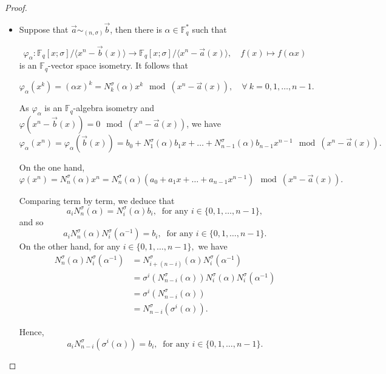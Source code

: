 \documentclass[12pt,paper]{article}
\theoremstyle{plain}
\newcommand{\Fq}{\mathbb{F}_{q}}
\begin{document}
\begin{proof}\;
\begin{itemize}
    \item[(1) $\Rightarrow$ (2):] 
    Suppose that $ \vec{a} \sim_{(n,\sigma)} \vec{b} $, then there is $\alpha \in \mathbb{F}_q^*$ such that

$$\varphi_{\alpha} : \Fq[x;\sigma] /\langle x^n - \vec{b}(x) \rangle \to \Fq[x;\sigma] /\langle x^n - \vec{a}(x) \rangle, \quad f(x) \mapsto f(\alpha x) $$
is an $\mathbb{F}_q$-vector space isometry.  It follows that

$$ 
\varphi_{\alpha}(x^{k}) = (\alpha x)^k = N^{\sigma}_k(\alpha) x^{k} \mod (x^n - \vec{a}(x)), \quad \forall  \ k = 0, 1, \ldots, n-1.
$$

As $\varphi_{\alpha}$ is an $\mathbb{F}_q$-algebra isometry and $ \varphi(x^n - \vec{b}(x)) = 0 \mod (x^n - \vec{a}(x))$, we have
\begin{equation}
\varphi_{\alpha}(x^n) =\varphi_{\alpha} (\vec{b}(x)) = b_0 + N_1^{\sigma}(\alpha) b_1 x + \ldots + N_{n-1}^{\sigma}(\alpha)b_{n-1} x^{n-1} \mod (x^n - \vec{a}(x)).
\end{equation}

On the one hand,
\begin{equation}
\varphi(x^n) = N^{\sigma}_n(\alpha) x^n = N^{\sigma}_n(\alpha) ( a_0 + a_1 x + \ldots + a_{n-1} x^{n-1}) \mod (x^n - \vec{a}(x)).
\end{equation}

Comparing term by term, we deduce that   
$$ a_i N_{n}^{\sigma}(\alpha) = N_i^{\sigma}(\alpha)b_i, \ \text{ for any }  i \in \{0, 1, \ldots, n-1\},$$ 
and so 
$$ a_i N_{n}^{\sigma}(\alpha)  N_i^{\sigma}(\alpha^{-1}) =b_i, \ \text{ for any }  i \in \{0, 1, \ldots, n-1\}.$$ 
On the other hand, for any $  i \in \{0, 1, \ldots, n-1\} , $ we have 
$$ \begin{array}{rl}
    N_n^{\sigma}(\alpha) N_{i}^{\sigma}(\alpha^{-1})  & =  N_{i+(n-i)}^{\sigma}(\alpha) N_{i}^{\sigma}(\alpha^{-1})\\
     &=   \sigma^{i}(N_{n-i}^{\sigma}(\alpha)) N^{\sigma}_{i}(\alpha) N_{i}^{\sigma}(\alpha^{-1})  \\
     &=  \sigma^{i}(N^{\sigma}_{n-i}(\alpha))\\
     & = N^{\sigma}_{n-i}(\sigma^{i}(\alpha)).
\end{array}
$$

Hence,
$$ a_i N_{n-i}^{\sigma}( \sigma^i(\alpha))  =b_i, \ \text{ for any }  i \in \{0, 1, \ldots, n-1\}.$$ 


\end{itemize}
\end{proof}
\end{document}
